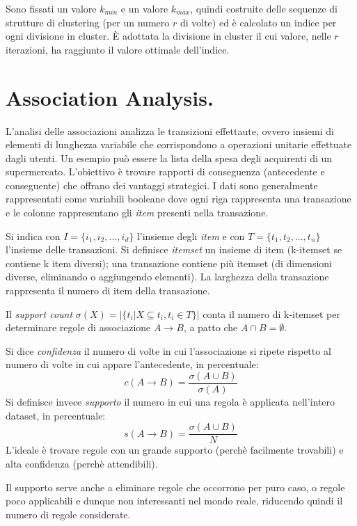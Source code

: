 \documentclass[11pt, a4page, twocolumn]{article}
\begin{document}
Sono fissati un valore $k_{min}$ e un valore $k_{max}$, quindi costruite delle sequenze di strutture di clustering (per un numero $r$ di volte) ed è calcolato un indice per ogni divisione in cluster.
È adottata la divisione in cluster il cui valore, nelle $r$ iterazioni, ha raggiunto il valore ottimale dell'indice. \newpage

\part{Association Analysis.}
L'analisi delle associazioni analizza le transizioni effettaute, ovvero insiemi di elementi di lunghezza variabile che corrispondono a operazioni unitarie effettuate dagli utenti.
Un esempio può essere la lista della spesa degli acquirenti di un supermercato.
L'obiettivo è trovare rapporti di conseguenza (antecedente e conseguente) che offrano dei vantaggi strategici.
I dati sono generalmente rappresentati come variabili booleane dove ogni riga rappresenta una transazione e le colonne rappresentano gli \textit{item} presenti nella transazione.

Si indica con $I = \{i_1, i_2, ..., i_d\}$ l'insieme degli \textit{item} e con $T = \{t_1, t_2, ..., t_n\}$ l'insieme delle transazioni.
Si definisce \textit{itemset} un insieme di item (k-itemset se contiene k item diversi); una transazione contiene più itemset (di dimensioni diverse, eliminando o aggiungendo elementi).
La larghezza della transazione rappresenta il numero di item della transazione.

Il \textit{support count} $\sigma(X) = |\{t_i | X \subseteq t_i, t_i \in T\}|$ conta il numero di k-itemset per determinare regole di associazione $A \rightarrow B$, a patto che $A \cap B = \emptyset$.

Si dice \textit{confidenza} il numero di volte in cui l'associazione si ripete rispetto al numero di volte in cui appare l'antecedente, in percentuale:
\begin{equation*}
c(A \rightarrow B) = \frac{\sigma(A \cup B)}{\sigma(A)}
\end{equation*}
Si definisce invece \textit{supporto} il numero in cui una regola è applicata nell'intero dataset, in percentuale:
\begin{equation*}
s(A \rightarrow B) = \frac{\sigma(A \cup B)}{N}
\end{equation*}
L'ideale è trovare regole con un grande supporto (perchè facilmente trovabili) e alta confidenza (perchè attendibili).

Il supporto serve anche a eliminare regole che occorrono per puro caso, o regole poco applicabili e dunque non interessanti nel mondo reale, riducendo quindi il numero di regole considerate. \newline
\end{document}
